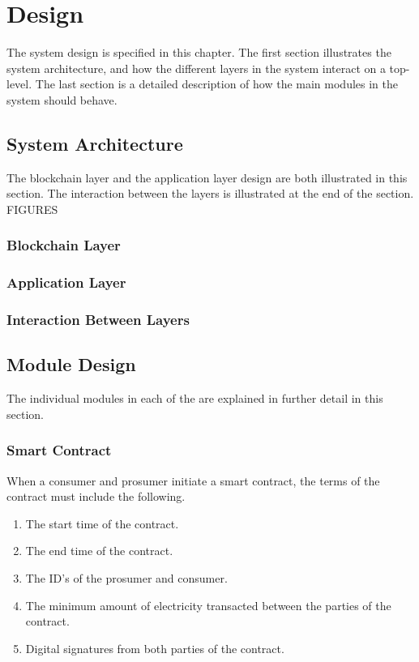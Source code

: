 \chapter{Design}
The system design is specified in this chapter. The first section illustrates the system architecture, and how the different layers in the system interact on a top-level. The last section is a detailed description of how the main modules in the system should behave.

\section{System Architecture}
The blockchain layer and the application layer design are both illustrated in this section. The interaction between the layers is illustrated at the end of the section.
FIGURES
\subsection{Blockchain Layer}
\subsection{Application Layer}
\subsection{Interaction Between Layers}

\section{Module Design}
The individual modules in each of the are explained in further detail in this section.
\subsection{Smart Contract}
When a consumer and prosumer initiate a smart contract, the terms of the contract must include the following.
\begin{enumerate}
\item The start time of the contract.
\item The end time of the contract.
\item The ID's of the prosumer and consumer.
\item The minimum amount of electricity transacted between the parties of the contract.
\item Digital signatures from both parties of the contract.
\end{enumerate}

